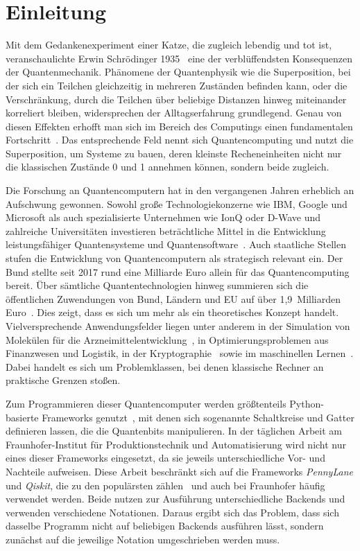\chapter{Einleitung}
\label{chap:einleitung}
Mit dem Gedankenexperiment einer Katze, die zugleich lebendig und tot ist, veranschaulichte Erwin Schrödinger 1935~\cite{schroedinger1935} eine der verblüffendsten Konsequenzen der Quantenmechanik. Phänomene der Quantenphysik wie die Superposition, bei der sich ein Teilchen gleichzeitig in mehreren Zuständen befinden kann, oder die Verschränkung, durch die Teilchen über beliebige Distanzen hinweg miteinander korreliert bleiben, widersprechen der Alltagserfahrung grundlegend. Genau von diesen Effekten erhofft man sich im Bereich des Computings einen fundamentalen Fortschritt~\cite{Taherdoost2025}. Das entsprechende Feld nennt sich Quantencomputing und nutzt die Superposition, um Systeme zu bauen, deren kleinste Recheneinheiten nicht nur die klassischen Zustände 0 und 1 annehmen können, sondern beide zugleich.

Die Forschung an Quantencomputern hat in den vergangenen Jahren erheblich an Aufschwung gewonnen. Sowohl große Technologiekonzerne wie IBM, Google und Microsoft als auch spezialisierte Unternehmen wie IonQ oder D-Wave und zahlreiche Universitäten investieren beträchtliche Mittel in die Entwicklung leistungsfähiger Quantensysteme und Quantensoftware~\cite{gibney2019quantum,bova2021commercial}. Auch staatliche Stellen stufen die Entwicklung von Quantencomputern als strategisch relevant ein. Der Bund stellte seit 2017 rund eine Milliarde Euro allein für das Quantencomputing bereit. Über sämtliche Quantentechnologien hinweg summieren sich die öffentlichen Zuwendungen von Bund, Ländern und EU auf über 1,9~Milliarden Euro~\cite{bundestag2025quantentechnologien}. Dies zeigt, dass es sich um mehr als ein theoretisches Konzept handelt. Vielversprechende Anwendungsfelder liegen unter anderem in der Simulation von Molekülen für die Arzneimittelentwicklung~\cite{santagati2024drug}, in Optimierungsproblemen aus Finanzwesen und Logistik, in der Kryptographie~\cite{bova2021commercial} sowie im maschinellen Lernen~\cite{biamonte2017quantum}. Dabei handelt es sich um Problemklassen, bei denen klassische Rechner an praktische Grenzen stoßen.

Zum Programmieren dieser Quantencomputer werden größtenteils Python-basierte Frameworks genutzt~\cite{fingerhuth2018opensource}, mit denen sich sogenannte Schaltkreise und Gatter definieren lassen, die die Quantenbits manipulieren. In der täglichen Arbeit am Fraunhofer-Institut für Produktionstechnik und Automatisierung wird nicht nur eines dieser Frameworks eingesetzt, da sie jeweils unterschiedliche Vor- und Nachteile aufweisen. Diese Arbeit beschränkt sich auf die Frameworks \textit{PennyLane} und \textit{Qiskit}, die zu den populärsten zählen~\cite{wang_advantages_2025} und auch bei Fraunhofer häufig verwendet werden. Beide nutzen zur Ausführung unterschiedliche Backends und verwenden verschiedene Notationen. Daraus ergibt sich das Problem, dass sich dasselbe Programm nicht auf beliebigen Backends ausführen lässt, sondern zunächst auf die jeweilige Notation umgeschrieben werden muss.

